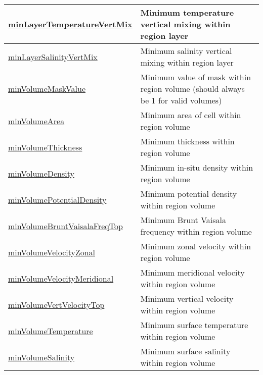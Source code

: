 {\begin{center}
\begin{longtable}{| p{2.0in} | p{4.0in} |}
    \hline
    \hyperref[subsec:var_sec_layerVolumeWeightedAverageAM_minLayerTemperatureVertMix]{minLayerTemperatureVertMix} & Minimum temperature vertical mixing within region layer \\
    \hline
    \hyperref[subsec:var_sec_layerVolumeWeightedAverageAM_minLayerSalinityVertMix]{minLayerSalinityVertMix} & Minimum salinity vertical mixing within region layer \\
    \hline
    \hyperref[subsec:var_sec_layerVolumeWeightedAverageAM_minVolumeMaskValue]{minVolumeMaskValue} & Minimum value of mask within region volume (should always be 1 for valid volumes) \\
    \hline
    \hyperref[subsec:var_sec_layerVolumeWeightedAverageAM_minVolumeArea]{minVolumeArea} & Minimum area of cell within region volume \\
    \hline
    \hyperref[subsec:var_sec_layerVolumeWeightedAverageAM_minVolumeThickness]{minVolumeThickness} & Minimum thickness within region volume \\
    \hline
    \hyperref[subsec:var_sec_layerVolumeWeightedAverageAM_minVolumeDensity]{minVolumeDensity} & Minimum in-situ density within region volume \\
    \hline
    \hyperref[subsec:var_sec_layerVolumeWeightedAverageAM_minVolumePotentialDensity]{minVolumePotentialDensity} & Minimum potential density within region volume \\
    \hline
    \hyperref[subsec:var_sec_layerVolumeWeightedAverageAM_minVolumeBruntVaisalaFreqTop]{minVolumeBruntVaisalaFreqTop} & Minimum Brunt Vaisala frequency within region volume \\
    \hline
    \hyperref[subsec:var_sec_layerVolumeWeightedAverageAM_minVolumeVelocityZonal]{minVolumeVelocityZonal} & Minimum zonal velocity within region volume \\
    \hline
    \hyperref[subsec:var_sec_layerVolumeWeightedAverageAM_minVolumeVelocityMeridional]{minVolumeVelocityMeridional} & Minimum meridional velocity within region volume \\
    \hline
    \hyperref[subsec:var_sec_layerVolumeWeightedAverageAM_minVolumeVertVelocityTop]{minVolumeVertVelocityTop} & Minimum vertical velocity within region volume \\
    \hline
    \hyperref[subsec:var_sec_layerVolumeWeightedAverageAM_minVolumeTemperature]{minVolumeTemperature} & Minimum surface temperature within region volume \\
    \hline
    \hyperref[subsec:var_sec_layerVolumeWeightedAverageAM_minVolumeSalinity]{minVolumeSalinity} & Minimum surface salinity within region volume \\

\end{longtable}
\end{center}}

